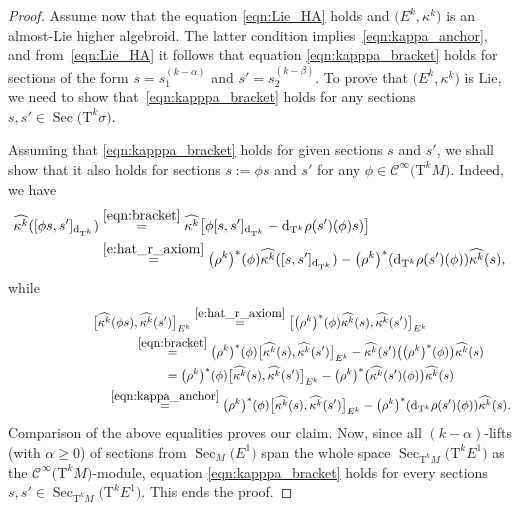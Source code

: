 \documentclass[10pt,a4paper]{amsart}
\newcommand{\wh}[1]{\widehat{#1}} %
\newcommand{\Sec}{\operatorname{Sec}}
\newcommand{\dd}{\mathrm{d}}
\newcommand{\T}{\mathrm{T}} %
\newcommand{\TT}[1]{\mathrm{T}^{#1}} %
\newcommand{\Cf}{\mathcal{C}^\infty}
\numberwithin{equation}{section}
\theoremstyle{definition}
\begin{document}
\begin{proof}
Assume now that the equation \eqref{eqn:Lie_HA} holds and $\big(E^k,\kappa^k\big)$ is an almost-Lie higher algebroid. The latter condition implies~\eqref{eqn:kappa_anchor}, and from~\eqref{eqn:Lie_HA} it follows that equation \eqref{eqn:kapppa_bracket} holds for sections of the form $s=s_1^{(k-\alpha)}$ and $s'=s_2^{(k-\beta)}$. To prove that $\big(E^k,\kappa^k\big)$ is Lie, we need to show that~\eqref{eqn:kapppa_bracket} holds for any sections $s, s'\in \Sec\big(\T^k \sigma\big)$.

 Assuming that \eqref{eqn:kapppa_bracket} holds for given sections $s$ and $s'$, we shall show that it also holds for sections $s:=\phi s$ and $s'$ for any $\phi\in \Cf\big(\T^k M\big)$. Indeed, we have
\begin{gather*}\begin{split}&
\wh{\kappa^k}([\phi s,s']_{\dd_{\TT{k}}}) \overset{\eqref{eqn:bracket}}= \wh{\kappa^k}\big[\phi [ s,s']_{\dd_{\TT{k}}} - {\dd_{\TT{k}}}\rho(s')(\phi) s)\big] \\
& \hphantom{\wh{\kappa^k}([\phi s,s']_{\dd_{\TT{k}}})}{} \overset{\eqref{e:hat_r_axiom}}= \big(\rho^k\big)^\ast (\phi) \wh{\kappa^k}([s, s']_{\dd_{\TT{k}}}) -
\big(\rho^k\big)^\ast ({\dd_{\TT{k}}}\rho(s')(\phi))\wh{\kappa^k}(s) ,\end{split}	
\end{gather*}
while
\begin{gather*}
\big[\wh{\kappa^k}(\phi s),\wh{\kappa^k}(s')\big]_{E^k} \overset{\eqref{e:hat_r_axiom}}= \big[\big(\rho^k\big)^\ast (\phi)\wh{\kappa^k}(s),\wh{\kappa^k}(s')\big]_{E^k}\\
\hphantom{\big[\wh{\kappa^k}(\phi s),\wh{\kappa^k}(s')\big]_{E^k}}{} \overset{\eqref{eqn:bracket}}= \big(\rho^k\big)^\ast (\phi)\big[\wh{\kappa^k}(s),\wh{\kappa^k}(s')\big]_{E^k} - \wh{\kappa^k}(s')\big(\big(\rho^k\big)^\ast(\phi)\big) \wh{\kappa^k}(s)\\
\hphantom{\big[\wh{\kappa^k}(\phi s),\wh{\kappa^k}(s')\big]_{E^k}}{} = \big(\rho^k\big)^\ast (\phi)\big[\wh{\kappa^k}(s),\wh{\kappa^k}(s')\big]_{E^k} - \big(\rho^k\big)^\ast\big(\wh{\kappa^k}(s')(\phi)\big) \wh{\kappa^k}(s)\\
\hphantom{\big[\wh{\kappa^k}(\phi s),\wh{\kappa^k}(s')\big]_{E^k}}{} \overset{\eqref{eqn:kappa_anchor}}= \big(\rho^k\big)^\ast (\phi)\big[\wh{\kappa^k}(s),\wh{\kappa^k}(s')\big]_{E^k} - \big(\rho^k\big)^\ast(\dd_{\TT k}\rho(s')(\phi)) \wh{\kappa^k}(s) .
\end{gather*} Comparison of the above equalities proves our claim.
Now, since all $(k-\alpha)$-lifts (with $\alpha\geq 0$) of sections from $\Sec_M\big(E^1\big)$ span the whole space $\Sec_{\TT{k} M}\big(\TT{k} E^1\big)$ as the $\Cf\big(\TT k M\big)$-module, equation \eqref{eqn:kapppa_bracket} holds for every sections $s,s'\in \Sec_{\TT{k} M}\big(\TT{k} E^1\big)$. This ends the proof.
\end{proof}
\end{document}
